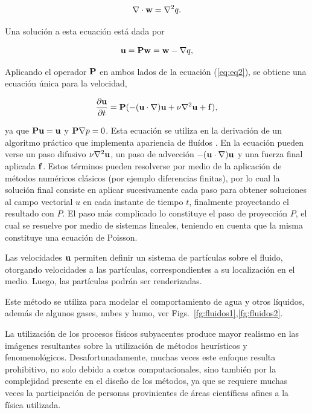\begin{equation}
\label{eq:eq4}
\nabla\cdot\bold{w} = \nabla^{2} q.
\end{equation}

Una solución a esta ecuación está dada por

\begin{equation}
\label{eq:eq5}
\bold{u} = \bold{P}\bold{w} = \bold{w} - \nabla q,
\end{equation}

Aplicando el operador $\bold{P}$ en ambos lados de la ecuación (\ref{eq:eq2}), se obtiene una ecuación única para la velocidad,

\begin{equation}
\frac{\partial \bold{u} }{\partial t} = \bold{P} (- (\bold{u} \cdot \nabla) \bold{u} + \nu \nabla^{2} \bold{u} + \bold{f}) \label{eq:eq6},
\end{equation}

ya que $\bold{P}\bold{u} = \bold{u}$ y $\bold{P}\nabla p = 0$.
Esta ecuación se utiliza en la derivación de un algoritmo práctico que implementa apariencia de fluídos \cite{Stam1999}.
En la ecuación pueden verse un paso difusivo $\nu \nabla^{2} \bold{u}$, un paso de advección $- (\bold{u} \cdot \nabla) \bold{u}$ y una fuerza final aplicada $\bold{f}$.
Estos términos pueden resolverse por medio de la aplicación de métodos numéricos clásicos (por ejemplo diferencias finitas), por lo cual la solución final consiste en aplicar sucesivamente cada paso para obtener soluciones al campo vectorial $u$ en cada instante de tiempo $t$, finalmente proyectando el resultado con $P$.
El paso más complicado lo constituye el paso de proyección $P$, el cual se resuelve por medio de sistemas lineales, teniendo en cuenta que la misma constituye una ecuación de Poisson.

Las velocidades $\bold{u}$ permiten definir un sistema de partículas sobre el fluido, otorgando velocidades a las partículas, correspondientes a su localización en el medio.
Luego, las partículas podrán ser renderizadas.

Este método se utiliza para modelar el comportamiento de agua y otros líquidos, además de algunos gases, nubes y humo, ver Figs.~\ref{fg:fluidos1},\ref{fg:fluidos2}.

La utilización de los procesos físicos subyacentes produce mayor realismo en las imágenes resultantes sobre la utilización de métodos heurísticos y fenomenológicos.
Desafortunadamente, muchas veces este enfoque resulta prohibitivo, no solo debido a costos computacionales, sino también por la complejidad presente en el diseño de los métodos, ya que se requiere muchas veces la participación de personas provinientes de áreas científicas afines a la física utilizada.


